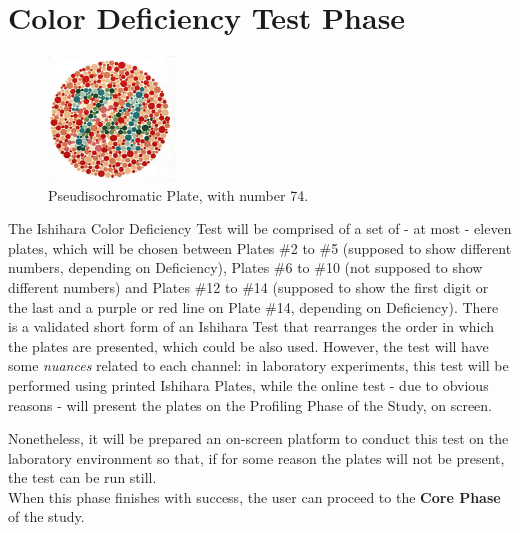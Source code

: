 \documentclass{report}
\begin{document}
\section{Color Deficiency Test Phase}
\label{ishihara}
\begin{figure}
	\centering
    \vspace{-\baselineskip}
    \includegraphics[width=0.3\textwidth]{IshiharaPlates.jpg}
    \caption[Color Deficiency Test Phase of First Study]{Pseudisochromatic Plate, with number 74.\protect\footnotemark{}}
\end{figure}
%
The Ishihara Color Deficiency Test will be comprised of a set of - at most - eleven plates, which will be chosen between Plates \#2 to \#5 (supposed to
show different numbers, depending on Deficiency), Plates \#6 to \#10 (not supposed to show different numbers) and Plates \#12 to \#14 (supposed to
show the first digit or the last and a purple or red line on Plate \#14, depending on Deficiency). There is a validated \cite{Alwis1992} short form of an Ishihara Test that rearranges the order in which the plates are presented, which could be also used. However, the test will have some \emph{nuances} related
to each channel: in laboratory experiments, this test will be performed using printed Ishihara Plates, while the online test - due to obvious reasons -
will present the plates on the Profiling Phase of the Study, on screen. \par
Nonetheless, it will be prepared an on-screen platform to conduct this test on the laboratory environment so that, if for some reason the plates will not
be present, the test can be run still. \\
When this phase finishes with success, the user can proceed to the \textbf{Core Phase} of the study.
%
\end{document}
